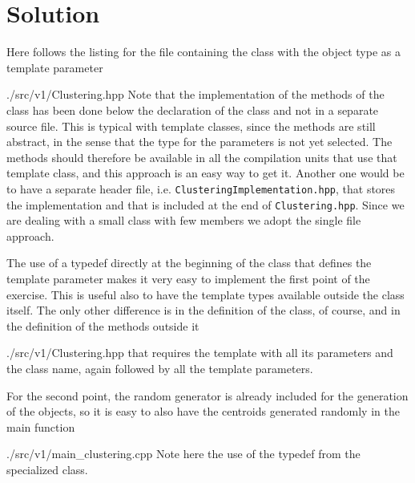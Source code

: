 \section*{Solution}

Here follows the listing for the file containing the  class with
the object type as a template parameter
%
\lstset{basicstyle=\scriptsize\sf}
    
    {./src/v1/Clustering.hpp}
\lstset{basicstyle=\sf}
%
Note that the implementation of the methods of the class has been done below the
declaration of the class and not in a separate source file. This is typical with
template classes, since the methods are still abstract, in the sense that the
type for the parameters is not yet selected. The methods should therefore be
available in all the compilation units that use that template class, and this
approach is an easy way to get it. Another one would be to have a separate
header file, i.e. \texttt{ClusteringImplementation.hpp}, that stores the
implementation and that is included at the end of \texttt{Clustering.hpp}. Since
we are dealing with a small class with few members we adopt the single file
approach.

The use of a typedef directly at the beginning of the class that defines the
template parameter makes it very easy to implement the first point of the
exercise. This is useful also to have the template types available outside the
class itself. The only other difference is in the definition of the class, of
course, and in the definition of the methods outside it
%
\lstset{basicstyle=\scriptsize\sf}
    
    {./src/v1/Clustering.hpp}
\lstset{basicstyle=\sf}
%
that requires the template with all its parameters and the class name, again
followed by all the template parameters.

For the second point, the random generator is already included for the
generation of the objects, so it is easy to also have the centroids generated
randomly in the main function
%
\lstset{basicstyle=\scriptsize\sf}
    
    {./src/v1/main_clustering.cpp}
\lstset{basicstyle=\sf}
%
Note here the use of the typedef from the specialized  class.

